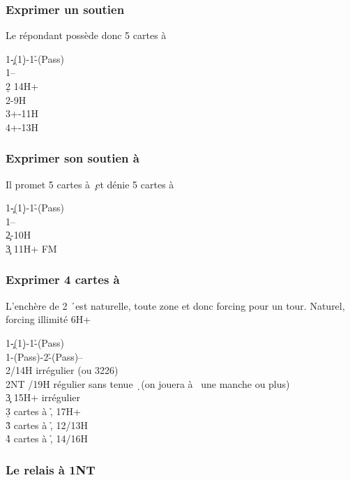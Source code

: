 \documentclass[a4paper]{article}
\begin{document}
\subsubsection{Exprimer un soutien \pdfs}

Le répondant possède donc 5 cartes à \s 

\begin{bidtable}
1\c-(1\d)-1\h-(Pass)\\
1\s--\\
2\d \> 14H+\\
2\s {}-9H\\
3\s {}+-11H\\
4\s {}+-13H
\end{bidtable}

\subsubsection{Exprimer son soutien à \pdfc}

Il promet 5 cartes à \c\ et dénie 5 cartes à \s 

\begin{bidtable}
1\c-(1\d)-1\h-(Pass)\\
1\s--\\
2\c {}-10H\\
3\c \> 11H+ FM
\end{bidtable}

\subsubsection{Exprimer 4 cartes à \pdfh}

L’enchère de 2 \h\ est naturelle, toute zone et donc forcing pour un tour.
Naturel, forcing illimité 6H+

\begin{bidtable}
1\c-(1\d)-1\h-(Pass)\\
1\s-(Pass)-2\h-(Pass)--\\
2\s {}/14H irrégulier (ou 3226)\\
2NT /19H régulier sans tenue \d\ (on jouera à \s\ une manche ou plus)\\
3\c \> 15H+ irrégulier\\
3\d {} cartes à \h , 17H+\\
3\h {} cartes à \h , 12/13H\\
4\h {} cartes à \h , 14/16H
\end{bidtable}

\subsubsection{Le relais à 1NT}
\end{document}
